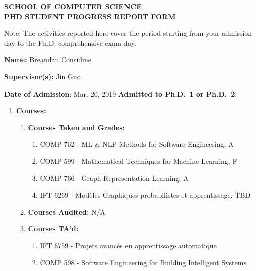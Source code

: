 \documentclass[11pt]{article}
\begin{document}
    \begin{center}
        \large {\bf SCHOOL OF COMPUTER SCIENCE \\ PHD STUDENT PROGRESS REPORT FORM}
    \end{center}

    Note: The activities reported here cover the period starting
    from your admission day to the Ph.D. comprehensive exam day.
    \medskip

    \textbf{Name:} Breandan Considine

    \textbf{Supervisor(s):} Jin Guo

    \textbf{Date of Admission}: Mar. 20, 2019
    \hspace{45mm}
    \textbf{Admitted to Ph.D.\ 1 or Ph.D.\ 2}:

    \begin{enumerate}
        \item \textbf{Courses:}
        \begin{enumerate}
            \item \textbf{Courses Taken and Grades:}

            \begin{enumerate}
                \item COMP 762 - ML \& NLP Methods for Software Engineering, A
                \item COMP 599 - Mathematical Techniques for Machine Learning, F
                \item COMP 766 - Graph Representation Learning, A
                \item IFT 6269 - Mod\`eles Graphiques probabilistes et apprentissage, TBD
            \end{enumerate}

            \item \textbf{Courses Audited:} N/A

            \item \textbf{Courses TA'd:}

            \begin{enumerate}
                \item IFT 6759 - Projets avanc\'es en apprentissage automatique
                \item COMP 598 - Software Engineering for Building Intelligent Systems
            \end{enumerate}


\end{enumerate}
\end{enumerate}
\end{document}
